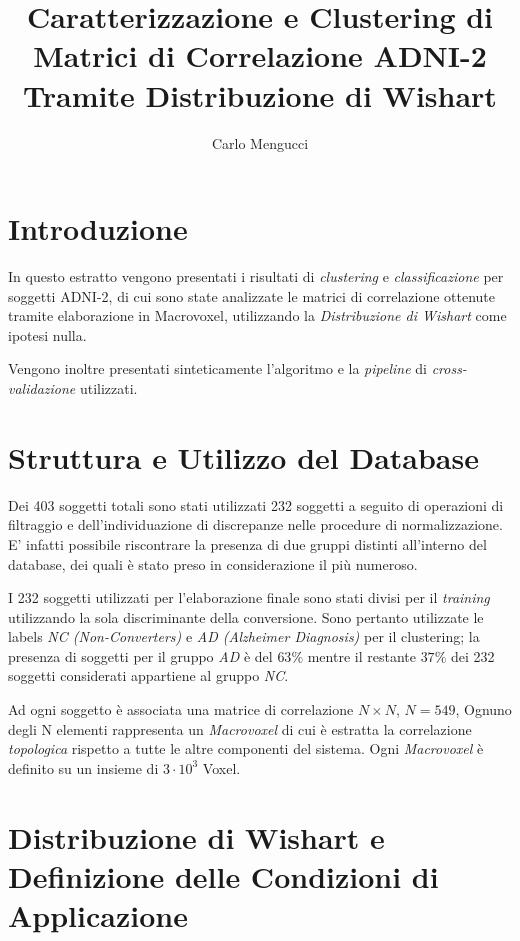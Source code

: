 \documentclass[12pt,openright,a4paper]{article}
\begin{document}
\title{Caratterizzazione e Clustering di Matrici di Correlazione ADNI-2 Tramite Distribuzione di Wishart}
\author{Carlo Mengucci}

\maketitle

\tableofcontents

\section{Introduzione}

In questo estratto vengono presentati i risultati di \textit{clustering} e \textit{classificazione} per soggetti ADNI-2, di cui sono state analizzate le matrici di correlazione ottenute tramite elaborazione in Macrovoxel, utilizzando la \textit{Distribuzione di Wishart} come ipotesi nulla.

Vengono inoltre presentati sinteticamente l'algoritmo e la \textit{pipeline} di \textit{cross-validazione} utilizzati.

\section{Struttura e Utilizzo del Database}

Dei 403 soggetti totali sono stati utilizzati 232 soggetti a seguito di operazioni di filtraggio e dell'individuazione di discrepanze nelle procedure di normalizzazione. E' infatti possibile riscontrare la presenza di due gruppi distinti all'interno del database, dei quali è stato preso in considerazione il più numeroso.

I 232 soggetti utilizzati per l'elaborazione finale sono stati divisi per il \textit{training} utilizzando la sola discriminante della conversione. Sono pertanto utilizzate le labels \textit{NC (Non-Converters)}  e \textit{AD (Alzheimer Diagnosis)} per il clustering; la presenza di soggetti per il gruppo \textit{AD} è del $63 \% $ mentre il restante  $37 \%$ dei 232 soggetti considerati appartiene al gruppo \textit{NC}.

Ad ogni soggetto è associata una matrice di correlazione $N\times N$, $N=549$, Ognuno degli N elementi rappresenta un \textit{Macrovoxel} di cui è estratta la correlazione \textit{topologica} rispetto a tutte le altre componenti del sistema. Ogni \textit{Macrovoxel} è definito su un insieme di $3\cdot10^3$ Voxel.

\section{Distribuzione di Wishart e Definizione delle Condizioni di Applicazione }
\end{document}
